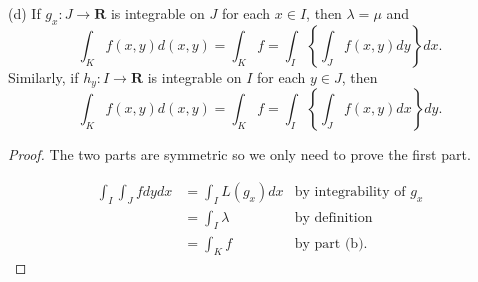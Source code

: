 \begin{itemize}
(d) If $g_x: J \rightarrow \boldsymbol{R}$ is integrable on $J$ for each $x \in I$, then $\lambda=\mu$ and
\[
\int_K f(x, y) d(x, y)=\int_K f=\int_I\left\{\int_J f(x, y) d y\right\} d x .
\]
Similarly, if $h_y: I \rightarrow \boldsymbol{R}$ is integrable on $I$ for each $y \in J$, then
\[
\int_K f(x, y) d(x, y)=\int_K f=\int_I\left\{\int_J f(x, y) d x\right\} d y .
\]
\begin{proof}
	The two parts are symmetric so we only need to prove the first part.

	\begin{align*}
		\int _I \int _J f dy dx
		&= \int _I L(g_x) dx & \text{by integrability of $g_x$}\\
		&= \int _I \lambda & \text{by definition}\\
		&= \int _K f & \text{by part (b)}
	.\end{align*}
\end{proof}

\end{itemize}
